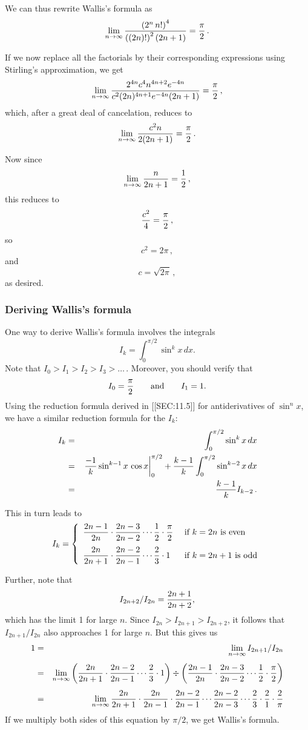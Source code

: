 {{{{We can thus rewrite Wallis's formula as
\[
\lim_{n \rightarrow \infty}{\left(2^n\,n!\right)^4 \over \left((2n)!\right)^2(2n+1)}= {\pi \over 2} \, .
\]

If we now replace all the factorials by their corresponding expressions using Stirling's approximation, we get
\[
\lim_{n \rightarrow \infty}{2^{4n}c^4n^{4n+2}e^{-4n} \over c^2(2n)^{4n+1}e^{-4n}(2n+1)}={\pi \over 2}\,,
\]
which, after a great deal of cancelation, reduces to
\[
\lim_{n \rightarrow \infty}{c^2n \over 2(2n+1)}={\pi \over 2}\,.
\]

Now since
\[
\lim_{n \rightarrow \infty} {n \over 2n+1} = {1 \over 2} \,,
\]
this reduces to
\[
{c^2 \over 4}={\pi \over 2} \,,
\]
so
\[
c^2 = 2\pi \,,
\]
and
\[
c=\sqrt{2\pi}\,,
\]
as desired.

\subsubsection{Deriving Wallis's formula}
One way to derive Wallis's formula involves the integrals
	\[
I_k = \int_0^{\pi/2}\sin^kx\,dx.
\]
Note that $I_0>I_1>I_2>I_3>\ldots \,.$  Moreover, you should verify that
	\[
I_0 = {\pi \over 2} \qquad \mbox{and} \qquad I_1=1.
\]
Using the reduction formula derived in [[SEC:11.5]] for antiderivatives of $\sin^n{x}$, we have a similar reduction formula for the $I_k$:
\begin{eqnarray*}
I_k&=&\int_0^{\pi/2}\sin^kx\,dx  \\
	&=&\left. {-1 \over k}\sin^{k-1}x\,\cos x \right|_0^{\pi/2}+{k-1 \over k} \int_0^{\pi/2} \sin^{k-2}x\,dx \\
	&=&{k-1 \over k} I_{k-2} \,.
\end{eqnarray*}

This in turn leads to
	\[
I_k  = \left\{ \begin{array}{ll}
						{\displaystyle {2n-1 \over 2n}\cdot {2n-3 \over 2n-2}\cdots {1 \over 2}\cdot  {\pi \over 2}} & \mbox{ if $k=2n$ is even} \\ [.15in]
						{\displaystyle {2n \over 2n+1}\cdot {2n-2 \over 2n-1}\cdots {2 \over 3}\cdot  1}  & \mbox { if $k=2n+1$ is odd}
						\end{array}
					\right.
\]				

	Further, note that
	\[
I_{2n+2}/I_{2n}= {2n+1 \over 2n+2},
\]
which has the limit 1 for large $n$.  Since $I_{2n}>I_{2n+1}>I_{2n+2}$, it follows that $I_{2n+1}/I_{2n}$ also approaches 1 for large $n$.  But this gives us
\begin{eqnarray*}
	1 &=&{\displaystyle\lim_{n \rightarrow \infty}I_{2n+1}/I_{2n}} \\[4pt]
	& = & {\displaystyle  \lim_{n \rightarrow \infty}
    	\left({2n \over 2n+1}\cdot {2n-2 \over 2n-1}\cdots 
		{2 \over 3}\cdot  1\right)
	\div 
	\left({2n-1 \over 2n}\cdot {2n-3 \over 2n-2}\cdots {1 \over 2}\cdot 
		{\pi \over 2}\right)} \\[4pt]
	& = & {\displaystyle\lim_{n \rightarrow \infty}
	{2n \over 2n+1}\cdot {2n \over 2n-1}\cdot {2n-2 \over 2n-1}\cdots 
	{2n-2 \over 2n-3} \cdots {2 \over 3}\cdot {2 \over 1}\cdot 
	{2 \over \pi}}
	\end{eqnarray*}
If we multiply both sides of this equation by $\pi/2$, we get Wallis's formula.

}}}}
